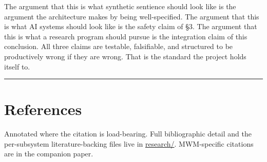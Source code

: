 \documentclass[12pt]{article}
\begin{document}
The argument that this is what synthetic sentience should look like is the argument the architecture makes by being well-specified. The argument that this is what AI systems should look like is the safety claim of §3. The argument that this is what a research program should pursue is the integration claim of this conclusion. All three claims are testable, falsifiable, and structured to be productively wrong if they are wrong. That is the standard the project holds itself to.

\begin{center}\rule{0.5\linewidth}{0.5pt}\end{center}

\section{References}\label{references}

Annotated where the citation is load-bearing. Full bibliographic detail and the per-subsystem literature-backing files live in \href{../research/}{research/}. MWM-specific citations are in the companion paper.
\end{document}
